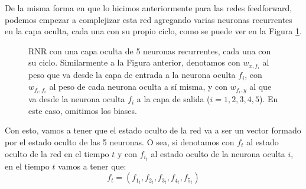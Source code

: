 \documentclass[../../main.tex]{subfiles}
\begin{document}
De la misma forma en que lo hicimos anteriormente para las redes feedforward, podemos
empezar a complejizar esta red agregando varias neuronas recurrentes en la capa oculta,
cada una con su propio ciclo, como se puede ver en la Figura \ref{fig:simple-rnn-2}.
\begin{figure}[ht]
    \centering
    \caption{RNR con una capa oculta de 5 neuronas recurrentes, cada una con su ciclo.
    Similarmente a la Figura anterior, denotamos con \(w_{x,f_i}\) al peso que va desde la
    capa de entrada a la neurona oculta \(f_i\), con \(w_{f_i, f_i}\) al peso de cada
    neurona oculta a sí misma, y con \(w_{f_i, y}\) al que va desde la neurona oculta
    \(f_i\) a la capa de salida (\(i=1,2,3,4,5\)). En este caso, omitimos los biases.}
    \label{fig:simple-rnn-2}
\end{figure}

Con esto, vamos a tener que el estado oculto de la red va a ser un vector formado por el
estado oculto de las 5 neuronas. O sea, si denotamos con \(f_t\) al estado oculto
de la red en el tiempo \(t\) y con \(f_{i_t}\) al estado oculto de la neurona oculta
\(i\), en el tiempo \(t\) vamos a tener que:
\begin{equation*}
    f_t = (f_{1_t}, f_{2_t}, f_{3_t}, f_{4_t}, f_{5_t})
\end{equation*}
\end{document}
